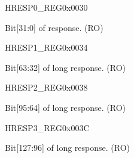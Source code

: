 \begin{register}{H}{RESP0\_REG}{0x0030}\label{regdesc:RESP0REG}
%
\regnewline%
\begin{regdesc}\begin{reglist}
\item [RESP0\_REG]Bit[31:0] of response. (RO)
\end{reglist}\end{regdesc}
\end{register}


\begin{register}{H}{RESP1\_REG}{0x0034}\label{regdesc:RESP1REG}
%
\regnewline%
\begin{regdesc}\begin{reglist}
\item [RESP1\_REG]Bit[63:32] of long response. (RO)
\end{reglist}\end{regdesc}
\end{register}


\begin{register}{H}{RESP2\_REG}{0x0038}\label{regdesc:RESP2REG}
%
\regnewline%
\begin{regdesc}\begin{reglist}
\item [RESP2\_REG]Bit[95:64] of long response. (RO)
\end{reglist}\end{regdesc}
\end{register}


\begin{register}{H}{RESP3\_REG}{0x003C}\label{regdesc:RESP3REG}
%
\regnewline%
\begin{regdesc}\begin{reglist}
\item [RESP3\_REG]Bit[127:96] of long response. (RO)
\end{reglist}\end{regdesc}
\end{register}


